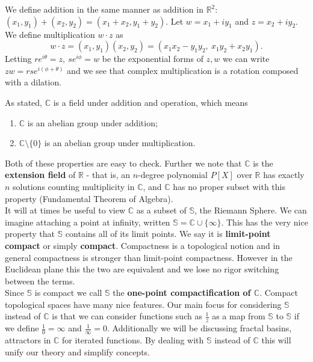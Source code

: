 \documentclass[11pt,oneside,final]{article}
\begin{document}
We define addition in the same manner as addition in \(\mathbb R^2\):
\((x_1, y_1) + (x_2, y_2) = (x_1 + x_2, y_1 + y_2)\). Let \(w = x_1 + iy_1\)
and \(z = x_2 + iy_2\). We define multiplication \(w\cdot z\) as
\[w \cdot z = (x_1,y_1)(x_2,y_2) = (x_1 x_2 - y_1 y_2,\ x_1y_2 + x_2y_1).\]
Letting \(re^{i\theta} = z,\ se^{i\phi} = w\) be the exponential forms of 
\(z,w\) we can write \(zw = rse^{i(\phi + \theta)}\) and we see that complex
multiplication is a rotation composed with a dilation.

As stated, \(\mathbb C\) is a field under addition and operation, which means
\begin{enumerate}
	\item \(\mathbb C\) is an abelian group under addition;
	\item \(\mathbb C\setminus \{0\}\) is an abelian group under multiplication.  
\end{enumerate}
Both of these properties are easy to check. Further we note that \(\mathbb C\)
is the \textbf{extension field} of \(\mathbb R\) - that is, an \(n\)-degree
polynomial \(P[X]\) over \(\mathbb R\) has exactly \(n\) solutions counting
multiplicity in \(\mathbb C\), and \(\mathbb C\) has no proper subset with
this property (Fundamental Theorem of Algebra). \\

It will at times be useful to view \(\mathbb C\) as a subset of \(\mathbb S\),
the Riemann Sphere. We can imagine attaching a point at infinity, written
\(\mathbb S = \mathbb C \cup \{\infty\}\). This has the very nice property
that \(\mathbb S\) contains all of its limit points. We say it is
\textbf{limit-point compact} or simply \textbf{compact}. Compactness is a 
topological notion and in general compactness is stronger than limit-point
compactness. However in the Euclidean plane this the two are equivalent and we
lose no rigor switching between the terms.\\
Since \(\mathbb S\) is compact we call \(\mathbb S\) the \textbf{one-point
compactification of \(\mathbb C\)}. Compact topological spaces have many nice
features. Our main focus for considering \(\mathbb S\) instead of \(\mathbb C\)
is that we can consider functions such as \(\frac{1}{z}\) as a map from 
\(\mathbb S\) to \(\mathbb S\) if we define \(\frac{1}{0} = \infty\) and 
\(\frac{1}{\infty} = 0\). Additionally we will be discussing fractal basins,
attractors in \(\mathbb C\) for iterated functions. By dealing with
\(\mathbb S\) instead of \(\mathbb C\) this will unify our theory and simplify
concepts.
\end{document}
